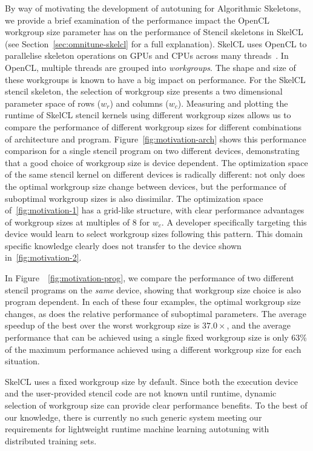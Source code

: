  By way of motivating the development of autotuning for Algorithmic Skeletons, we provide a brief examination of the performance impact the OpenCL workgroup size parameter has on the performance of Stencil skeletons in SkelCL (see Section~\ref{sec:omnitune-skelcl} for a full explanation). SkelCL uses OpenCL to parallelise skeleton operations on GPUs and CPUs across many threads~\cite{Steuwer2011}. In OpenCL, multiple threads are grouped into \emph{workgroups}. The shape and size of these workgroups is known to have a big impact on performance. For the SkelCL stencil skeleton, the selection of workgroup size presents a two dimensional parameter space of rows ($w_r$) and columns ($w_c$). Measuring and plotting the runtime of SkelCL stencil kernels using different workgroup sizes allows us to compare the performance of different workgroup sizes for different combinations of architecture and program. Figure~\ref{fig:motivation-arch} shows this performance comparison for a single stencil program on two different devices, demonstrating that a good choice of workgroup size is device dependent. The optimization space of the same stencil kernel on different devices is radically different: not only does the optimal workgroup size change between devices, but the performance of suboptimal workgroup sizes is also dissimilar. The optimization space of~\ref{fig:motivation-1} has a grid-like structure, with clear performance advantages of workgroup sizes at multiples of 8 for $w_c$. A developer specifically targeting this device would learn to select workgroup sizes following this pattern. This domain specific knowledge clearly does not transfer to the device shown in~\ref{fig:motivation-2}.

  In Figure~~\ref{fig:motivation-prog}, we compare the performance of two different stencil programs on the \emph{same} device, showing that workgroup size choice is also program dependent. In each of these four examples, the optimal workgroup size changes, as does the relative performance of suboptimal parameters. The average speedup of the best over the worst workgroup size is $37.0\times$, and the average performance that can be achieved using a single fixed workgroup size is only 63\% of the maximum performance achieved using a different workgroup size for each situation.

  SkelCL uses a fixed workgroup size by default. Since both the execution device and the user-provided stencil code are not known until runtime, dynamic selection of workgroup size can provide clear performance benefits. To the best of our knowledge, there is currently no such generic system meeting our requirements for lightweight runtime machine learning autotuning with distributed training sets.


